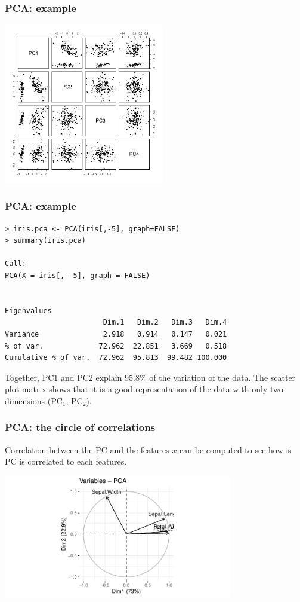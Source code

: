 \begin{frame}
\frametitle{PCA: example}
\begin{center}
\includegraphics[width=7cm]{../../Graphs/Iris_pca.pdf}
\end{center}
\end{frame}
\begin{frame}[fragile]
\frametitle{PCA: example}
\scriptsize
\begin{verbatim}
> iris.pca <- PCA(iris[,-5], graph=FALSE) 
> summary(iris.pca)

Call:
PCA(X = iris[, -5], graph = FALSE) 


Eigenvalues
                       Dim.1   Dim.2   Dim.3   Dim.4
Variance               2.918   0.914   0.147   0.021
% of var.             72.962  22.851   3.669   0.518
Cumulative % of var.  72.962  95.813  99.482 100.000
\end{verbatim}
\normalsize
Together, PC1 and PC2 explain $95.8\%$ of the variation of the data. The scatter plot matrix shows that it is a good representation of the data with only two dimensions (PC$_1$, PC$_2$).
\end{frame}
\begin{frame}
\frametitle{PCA: the circle of correlations}
Correlation between the PC and the features $x$ can be computed to see how is PC is correlated to each features.
\begin{center}
\includegraphics[width=10cm]{../../Graphs/Iris_pcacircle.pdf}
\end{center}
\end{frame}
